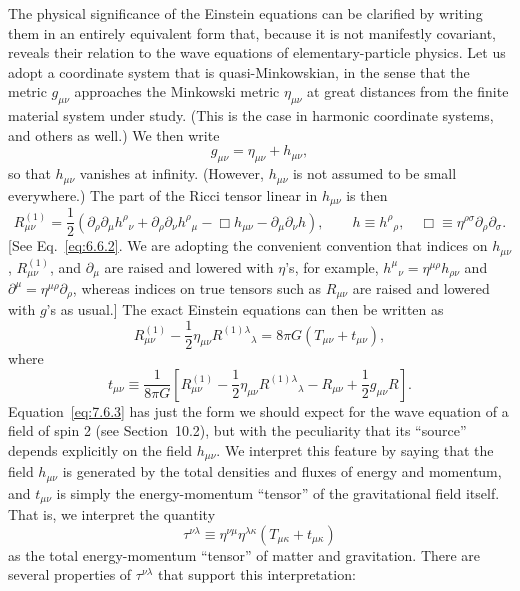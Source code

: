 The physical significance of the Einstein equations can be clarified by
writing them in an entirely equivalent form that, because it is not
manifestly covariant, reveals their relation to the wave equations of
elementary-particle physics. Let us adopt a coordinate system that is
quasi-Minkowskian, in the sense that the metric \(g_{\mu\nu}\) approaches
the Minkowski metric \(\eta_{\mu\nu}\) at great distances from the finite
material system under study. (This is the case in harmonic coordinate
systems, and others as well.) We then write
\begin{equation}
  g_{\mu\nu}=\eta_{\mu\nu}+h_{\mu\nu},
  \tag{7.6.1}\label{eq:7.6.1}
\end{equation}
so that \(h_{\mu\nu}\) vanishes at infinity. (However, \(h_{\mu\nu}\) is
not assumed to be small everywhere.) The part of the Ricci tensor linear in
\(h_{\mu\nu}\) is then
\begin{equation}
  R^{(1)}_{\mu\nu}
  =
  \frac12\left(
    \partial_\rho\partial_\mu h^\rho{}_\nu
    +\partial_\rho\partial_\nu h^\rho{}_\mu
    -\Box h_{\mu\nu}
    -\partial_\mu\partial_\nu h
  \right),
  \qquad
  h\equiv h^\rho{}_\rho,
  \quad
  \Box\equiv\eta^{\rho\sigma}\partial_\rho\partial_\sigma .
  \tag{7.6.2}\label{eq:7.6.2}
\end{equation}
[See Eq.~\eqref{eq:6.6.2}. We are adopting the convenient convention that
indices on \(h_{\mu\nu}\), \(R^{(1)}_{\mu\nu}\), and \(\partial_\mu\) are
raised and lowered with \(\eta\)'s, for example,
\(h^\mu{}_\nu=\eta^{\mu\rho}h_{\rho\nu}\) and
\(\partial^\mu=\eta^{\mu\rho}\partial_\rho\), whereas indices on true
tensors such as \(R_{\mu\nu}\) are raised and lowered with \(g\)'s as
usual.] The exact Einstein equations can then be written as
\begin{equation}
  R^{(1)}_{\mu\nu}
  -\frac12\eta_{\mu\nu}R^{(1)\lambda}{}_\lambda
  =
  8\pi G\left(T_{\mu\nu}+t_{\mu\nu}\right),
  \tag{7.6.3}\label{eq:7.6.3}
\end{equation}
where
\begin{equation}
  t_{\mu\nu}
  \equiv
  \frac{1}{8\pi G}\left[
    R^{(1)}_{\mu\nu}
    -\frac12\eta_{\mu\nu}R^{(1)\lambda}{}_\lambda
    -R_{\mu\nu}
    +\frac12g_{\mu\nu}R
  \right].
  \tag{7.6.4}\label{eq:7.6.4}
\end{equation}
Equation~\eqref{eq:7.6.3} has just the form we should expect for the wave
equation of a field of spin 2 (see Section~10.2), but with the peculiarity
that its ``source'' depends explicitly on the field \(h_{\mu\nu}\). We
interpret this feature by saying that the field \(h_{\mu\nu}\) is generated
by the total densities and fluxes of energy and momentum, and
\(t_{\mu\nu}\) is simply the energy-momentum ``tensor'' of the
gravitational field itself. That is, we interpret the quantity
\begin{equation}
  \tau^{\nu\lambda}
  \equiv
  \eta^{\nu\mu}\eta^{\lambda\kappa}
  \left(T_{\mu\kappa}+t_{\mu\kappa}\right)
  \tag{7.6.5}\label{eq:7.6.5}
\end{equation}
as the total energy-momentum ``tensor'' of matter and gravitation. There
are several properties of \(\tau^{\nu\lambda}\) that support this
interpretation:

